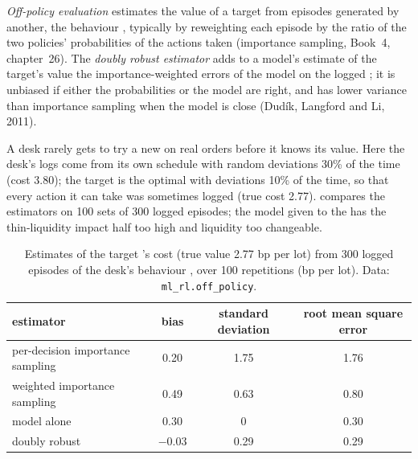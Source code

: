 \begin{definition}\label{def:ml:reinforcement-learning-foundations:ope}
\emph{Off-policy evaluation} estimates the value of a target  from episodes generated by
another, the behaviour , typically by reweighting each episode by the ratio of the two policies' probabilities of the
actions taken (importance sampling, Book~4, chapter~26). The \emph{doubly robust estimator}
adds to a model's estimate of the target's value the importance-weighted errors of the model on the logged ; it is
unbiased if either the probabilities or the model are right, and has lower variance than importance sampling when the model
is close (Dudík, Langford and Li, 2011).
\end{definition}

A desk rarely gets to try a new  on real orders before it knows its value. Here the desk's logs come from its own
schedule with random deviations 30\% of the time (cost 3.80); the target is the optimal  with deviations 10\% of the
time, so that every action it can take was sometimes logged (true cost 2.77).  compares the estimators
on 100 sets of 300 logged episodes; the model given to the  has the thin-liquidity impact half too
high and liquidity too changeable.

\begin{table}[htbp]
\centering\small
\begin{tabular}{@{}lccc@{}}
\toprule
estimator & bias & standard deviation & root mean square error\\
\midrule
per-decision importance sampling & 0.20 & 1.75 & 1.76\\
weighted importance sampling & 0.49 & 0.63 & 0.80\\
model alone & 0.30 & 0 & 0.30\\
doubly robust & $-0.03$ & 0.29 & 0.29\\
\bottomrule
\end{tabular}
\caption{Estimates of the target 's cost (true value 2.77 bp per lot) from 300 logged episodes of the desk's
behaviour , over 100 repetitions (bp per lot). Data: \texttt{ml\_rl.off\_policy}.}\label{tab:ml:rl:ope}
\end{table}

